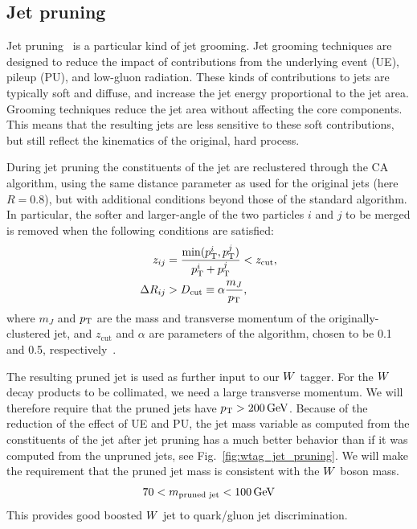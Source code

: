 



\subsection{Jet pruning}

Jet pruning~\cite{Ellis:2009su,Ellis:2009me} is a particular kind of jet grooming. Jet grooming
techniques are designed to reduce the impact of contributions from the underlying event (UE), pileup
(PU), and low-\pt gluon radiation. These kinds of contributions to jets are typically soft and
diffuse, and increase the jet energy proportional to the jet area. Grooming techniques reduce the
jet area without affecting the core components. This means that the resulting jets are less
sensitive to these soft contributions, but still reflect the kinematics of the original, hard
process.


During jet pruning the constituents of the jet are reclustered through the CA algorithm, using the
same distance parameter as used for the original jets (here $R=0.8$), but with additional conditions
beyond those of the standard algorithm.
In particular, the softer and larger-angle of the two particles $i$ and $j$ to be merged is removed
when the following conditions are satisfied:
\begin{align}
  z_{ij} &= \frac{\min( p_{\mathrm{T}}^i , p_{\mathrm{T}}^j )}{p_{\mathrm{T}}^i + p_{\mathrm{T}}^j} < z_{\textrm{cut}}, \\
  \Delta R_{ij} &> D_{\textrm{cut}} \equiv \alpha \frac{m_J}{p_{\mathrm{T}}} ,
\end{align}
where $m_J$ and $p_{\mathrm{T}}$ are the mass and transverse momentum of the originally-clustered jet, and
$z_\textrm{cut}$ and $\alpha$ are parameters of the algorithm, chosen to be 0.1 and 0.5,
respectively~\cite{Chatrchyan:2013vbb}. 

The resulting pruned jet is used as further input to our $W$ tagger. For the $W$ decay products
to be collimated, we need a large transverse momentum. We will therefore require that the pruned
jets have $p_{\mathrm{T}} > 200\,\text{Ge\hspace{-.08em}V}$. 
Because of the reduction of the effect of UE and PU, the jet mass variable as computed from the
constituents of the jet after jet pruning has a much better behavior than if it was computed from
the unpruned jets, see Fig.~\ref{fig:wtag_jet_pruning}. 
We will make the requirement that the pruned jet mass is consistent with the $W$ boson mass.
\begin{equation}
  70 < m_{\textrm{pruned jet}} < 100 \,\text{Ge\hspace{-.08em}V}
\end{equation}
This provides good boosted $W$ jet to quark/gluon jet discrimination. 

